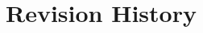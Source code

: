 \documentclass[../../../../testPlan.tex]{subfiles}
\begin{document}
	\section{Revision History}
\end{document}
